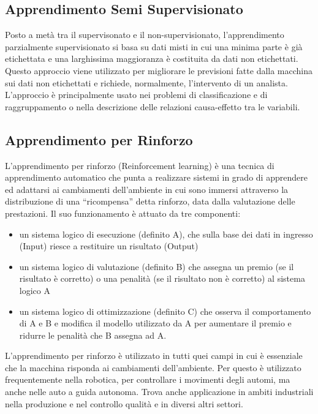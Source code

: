 \subsection{Apprendimento Semi Supervisionato}
Posto a metà tra il supervisonato e il non-supervisionato, l’apprendimento parzialmente supervisionato si basa su dati misti in cui una minima parte è già etichettata e una larghissima maggioranza è costituita da dati non etichettati.  Questo approccio viene utilizzato per migliorare le previsioni fatte dalla macchina sui dati non etichettati e richiede, normalmente, l’intervento di un analista. L’approccio è principalmente usato nei problemi di classificazione e di raggruppamento o nella descrizione delle relazioni causa-effetto tra le variabili.

\subsection{Apprendimento per Rinforzo}
L'apprendimento per rinforzo (Reinforcement learning) è una tecnica di apprendimento automatico che punta a realizzare sistemi in grado di apprendere ed adattarsi ai cambiamenti dell’ambiente in cui sono immersi attraverso la distribuzione di una “ricompensa” detta rinforzo, data dalla valutazione delle prestazioni.
Il suo funzionamento è attuato da tre componenti:
\begin{itemize}
\item un sistema logico di esecuzione (definito A), che sulla base dei dati in ingresso (Input) riesce a restituire un risultato (Output)
\item un sistema logico di valutazione (definito B) che assegna un premio (se il risultato è corretto) o una penalità (se il risultato non è corretto) al sistema logico A
\item un sistema logico di ottimizzazione (definito C) che osserva il comportamento di A e B e modifica il modello utilizzato da A per aumentare il premio e ridurre le penalità che B assegna ad A.
\end{itemize}

L’apprendimento per rinforzo è utilizzato in tutti quei campi in cui è essenziale che la macchina risponda ai cambiamenti dell’ambiente. Per questo è utilizzato frequentemente nella robotica, per controllare i movimenti degli automi, ma anche nelle auto a guida autonoma. Trova anche applicazione in ambiti industriali nella produzione e nel controllo qualità e in diversi altri settori.



